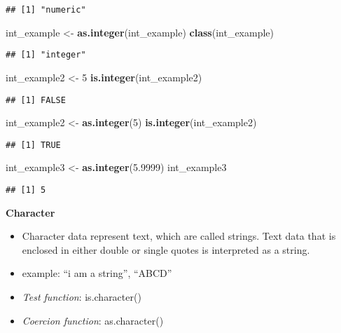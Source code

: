 \documentclass[]{article}
\newenvironment{Shaded}{\begin{snugshade}}{\end{snugshade}}
\newcommand{\KeywordTok}[1]{\textcolor[rgb]{0.13,0.29,0.53}{\textbf{#1}}}
\newcommand{\DecValTok}[1]{\textcolor[rgb]{0.00,0.00,0.81}{#1}}
\newcommand{\FloatTok}[1]{\textcolor[rgb]{0.00,0.00,0.81}{#1}}
\newcommand{\StringTok}[1]{\textcolor[rgb]{0.31,0.60,0.02}{#1}}
\newcommand{\NormalTok}[1]{#1}
\providecommand{\tightlist}{%
  \setlength{\itemsep}{0pt}\setlength{\parskip}{0pt}}
\begin{document}
\begin{verbatim}
## [1] "numeric"
\end{verbatim}

\begin{Shaded}
\begin{Highlighting}[]
\NormalTok{int_example <-}\StringTok{ }\KeywordTok{as.integer}\NormalTok{(int_example)}
\KeywordTok{class}\NormalTok{(int_example)}
\end{Highlighting}
\end{Shaded}

\begin{verbatim}
## [1] "integer"
\end{verbatim}

\begin{Shaded}
\begin{Highlighting}[]
\NormalTok{int_example2 <-}\StringTok{ }\DecValTok{5}
\KeywordTok{is.integer}\NormalTok{(int_example2)}
\end{Highlighting}
\end{Shaded}

\begin{verbatim}
## [1] FALSE
\end{verbatim}

\begin{Shaded}
\begin{Highlighting}[]
\NormalTok{int_example2 <-}\StringTok{ }\KeywordTok{as.integer}\NormalTok{(}\DecValTok{5}\NormalTok{)}
\KeywordTok{is.integer}\NormalTok{(int_example2)}
\end{Highlighting}
\end{Shaded}

\begin{verbatim}
## [1] TRUE
\end{verbatim}

\begin{Shaded}
\begin{Highlighting}[]
\NormalTok{int_example3 <-}\StringTok{ }\KeywordTok{as.integer}\NormalTok{(}\FloatTok{5.9999}\NormalTok{)}
\NormalTok{int_example3}
\end{Highlighting}
\end{Shaded}

\begin{verbatim}
## [1] 5
\end{verbatim}

\textbf{Character}

\begin{itemize}
\tightlist
\item
  Character data represent text, which are called strings. Text data
  that is enclosed in either double or single quotes is interpreted as a
  string.
\item
  example: ``i am a string'', ``ABCD''
\item
  \emph{Test function}: is.character()
\item
  \emph{Coercion function}: as.character()
\end{itemize}
\end{document}
